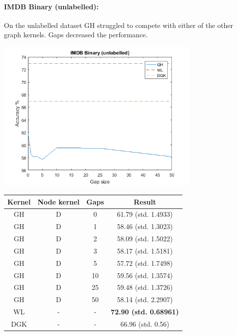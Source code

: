 \documentclass{article}
\begin{document}
\paragraph{IMDB Binary (unlabelled):}
On the unlabelled dataset GH struggled to compete with either of the other graph kernels. Gaps decreased the performance.
\\
\begin{minipage}{0.6\linewidth}
	\hspace*{-1in}
	\includegraphics[width=10cm]{imdb_unlabelled}
	\label{fig:imdb_unlabelled}
\end{minipage}
\begin{minipage}[c]{0.5\linewidth}	
	\centering
	\begin{tabular}{c|c|c|c}
		Kernel & Node kernel & Gaps & Result\\
		\hline
		GH & D & 0 & 61.79 (std. 1.4933)\\
		GH & D & 1 & 58.46 (std. 1.3023)\\
		GH & D & 2 & 58.09 (std. 1.5022)\\
		GH & D & 3 & 58.17 (std. 1.5181)\\
		GH & D & 5 & 57.72 (std. 1.7498)\\
		GH & D & 10 & 59.56 (std. 1.3574)\\
		GH & D & 25 & 59.48 (std. 1.3726)\\
		GH & D & 50 & 58.14 (std. 2.2907)\\
		WL & - & - & \textbf{72.90 (std. 0.68961)}\\
		DGK\cite{yanardag} & - & - & 66.96 (std. 0.56) \\
	\end{tabular}
	\label{table:imdb_unlabelled}
\end{minipage}
\end{document}
